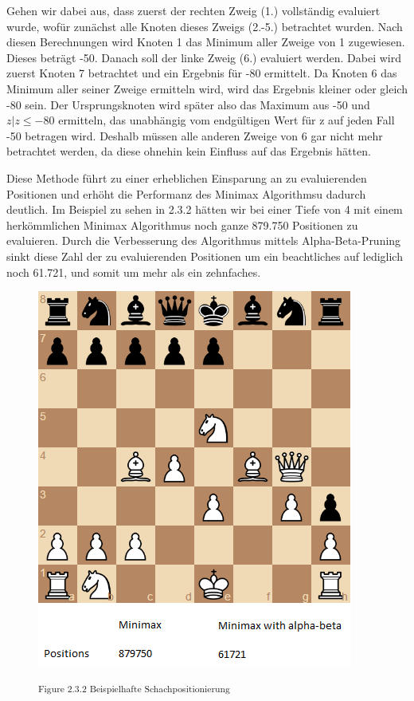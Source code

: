 Gehen wir dabei aus, dass zuerst der rechten Zweig (1.) vollständig evaluiert wurde, wofür zunächst alle Knoten dieses Zweigs (2.-5.) betrachtet wurden. Nach diesen Berechnungen wird Knoten 1 das Minimum aller Zweige von 1 zugewiesen. Dieses beträgt -50. Danach soll der linke Zweig (6.) evaluiert werden. Dabei wird zuerst Knoten 7 betrachtet und ein Ergebnis für -80 ermittelt. Da Knoten 6 das Minimum aller seiner Zweige ermitteln wird, wird das Ergebnis kleiner oder gleich -80 sein. Der Ursprungsknoten wird später also das Maximum aus -50 und $z | z \leq -80$ ermitteln, das unabhängig vom endgültigen Wert für z auf jeden Fall -50 betragen wird. Deshalb müssen alle anderen Zweige von 6 gar nicht mehr betrachtet werden, da diese ohnehin kein Einfluss auf das Ergebnis hätten.

Diese Methode führt zu einer erheblichen Einsparung an zu evaluierenden Positionen und erhöht die Performanz des Minimax Algorithmsu dadurch deutlich. Im Beispiel zu sehen in 2.3.2 hätten wir bei einer Tiefe von 4 mit einem herkömmlichen Minimax Algorithmus noch ganze 879.750 Positionen zu evaluieren. Durch die Verbesserung des Algorithmus mittels Alpha-Beta-Pruning sinkt diese Zahl der zu evaluierenden Positionen um ein beachtliches auf lediglich noch 61.721, und somit um mehr als ein zehnfaches.

\begin{figure}[h]
\centering
\includegraphics[width=\textwidth/2]{images/alpha-beta-example.png}

\textsuperscript{Figure 2.3.2 Beispielhafte Schachpositionierung \cite{}}\\
\end{figure}

